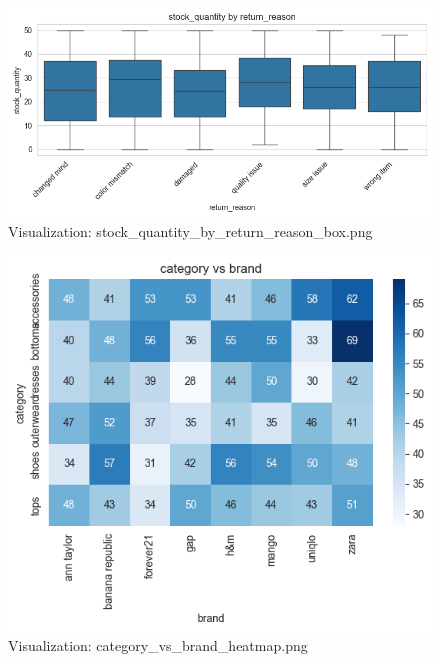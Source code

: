 \documentclass{article}%
\begin{document}
\begin{minipage}[c]{0.48\textwidth}%


\begin{figure}[H]%
\centering%
\includegraphics[width=\linewidth]{output/plots/stock_quantity_by_return_reason_box.png}%
\caption{Visualization: stock\_quantity\_by\_return\_reason\_box.png}%
\end{figure}

%
\end{minipage}%
\begin{minipage}[c]{0.48\textwidth}%


\begin{figure}[H]%
\centering%
\includegraphics[width=\linewidth]{output/plots/category_vs_brand_heatmap.png}%
\caption{Visualization: category\_vs\_brand\_heatmap.png}%
\end{figure}

%
\end{minipage}%
\end{document}
